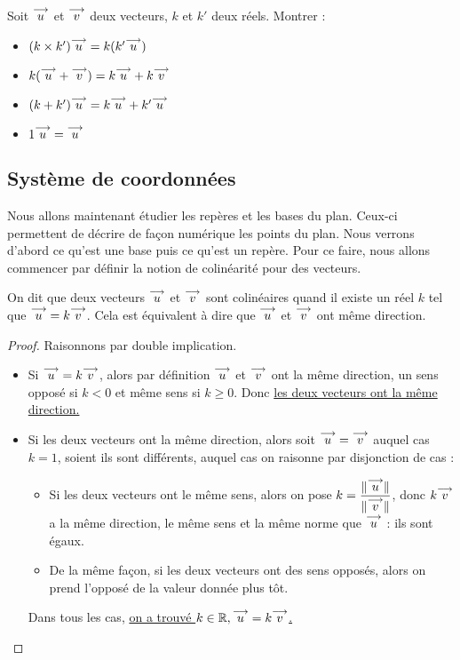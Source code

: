 \begin{exo}\label{exo_identites_vect}
    Soit $\overset{\longrightarrow}{u}$ et $\overset{\longrightarrow}{v}$ deux vecteurs, $k$ et $k'$ deux réels. Montrer :
    \begin{itemize}[label=$\bullet$]
        \item $(k\times k')\overset{\longrightarrow}{u}=k(k'\overset{\longrightarrow}{u})$
        \item $k(\overset{\longrightarrow}{u} + \overset{\longrightarrow}{v})=k\overset{\longrightarrow}{u} + k\overset{\longrightarrow}{v}$
        \item $(k + k')\overset{\longrightarrow}{u} = k\overset{\longrightarrow}{u} + k'\overset{\longrightarrow}{u}$
        \item $1\overset{\longrightarrow}{u}=\overset{\longrightarrow}{u}$
    \end{itemize}
\end{exo}

\subsection{Système de coordonnées}

Nous allons maintenant étudier les repères et les bases du plan. Ceux-ci permettent de décrire de façon numérique les points du plan. Nous verrons d'abord ce qu'est une base puis ce qu'est un repère. Pour ce faire, nous allons commencer par définir la notion de colinéarité pour des vecteurs.

\begin{defi}
    On dit que deux vecteurs $\overset{\longrightarrow}{u}$ et $\overset{\longrightarrow}{v}$ sont colinéaires quand il existe un réel $k$ tel que $\overset{\longrightarrow}{u} = k \overset{\longrightarrow}{v}$. Cela est équivalent à dire que $\overset{\longrightarrow}{u}$ et $\overset{\longrightarrow}{v}$ ont même direction.
\end{defi}
\begin{proof}
    Raisonnons par double implication.
    \begin{itemize}[label=$\bullet$]
        \item Si $\overset{\longrightarrow}{u}=k\overset{\longrightarrow}{v}$, alors par définition $\overset{\longrightarrow}{u}$ et $\overset{\longrightarrow}{v}$ ont la même direction, un sens opposé si $k<0$ et même sens si $k\geq 0$. Donc \underline{les deux vecteurs ont la même direction.}
        \item Si les deux vecteurs ont la même direction, alors soit $\overset{\longrightarrow}{u}=\overset{\longrightarrow}{v}$ auquel cas $k=1$, soient ils sont différents, auquel cas on raisonne par disjonction de cas :
        \begin{itemize}
            \item Si les deux vecteurs ont le même sens, alors on pose $k=\dfrac{\|\overset{\longrightarrow}{u}\|}{\|\overset{\longrightarrow}{v}\|}$, donc $k\overset{\longrightarrow}{v}$ a la même direction, le même sens et la même norme que $\overset{\longrightarrow}{u}$ : ils sont égaux.
            \item De la même façon, si les deux vecteurs ont des sens opposés, alors on prend l'opposé de la valeur donnée plus tôt.
        \end{itemize}
        Dans tous les cas, \underline{on a trouvé $k\in\mathbb{R},\overset{\longrightarrow}{u}=k\overset{\longrightarrow}{v}$.}
    \end{itemize}
    
\end{proof}

